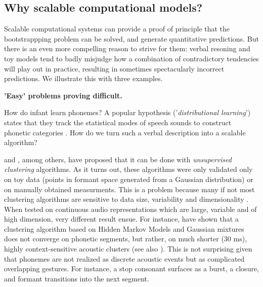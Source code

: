 \documentclass[jou,apacite]{apa6}
\renewcommand{\subsubsection}[1]{\textbf{#1}\hspace{0.3cm}}
\begin{document}
\subsection{Why scalable computational models?}\label{section:model} 




Scalable computational systems can provide a proof of principle that the bootstrappping problem can be solved, and generate quantitative predictions.  But there is an even more compelling reason to strive for them:  verbal resoning and toy models tend to badly misjudge how a combination of contradictory tendencies will play out in practice, resulting in sometimes spectacularly incorrect predictions. We illustrate this with three examples. 


\subsubsection{'Easy' problems proving difficult.}\label{section:theorybenefit}

How do infant learn phonemes? A popular hypothesis ('\textit{distributional learning}') states that they track the statistical modes of speech sounds to construct phonetic categories \cite{maye_2002}. How do we turn such a verbal description into a scalable algorithm?  

 and , among others, have proposed that it can be done with \textit{unsupervised clustering} algorithms.  As it turns out, these algorithms were only validated only on toy data (points in formant space generated from a Gaussian distribution) or on manually obtained measurments. This is a problem because many if not most clustering algorithms are sensitive to data size, variability and dimensionality \cite{fahad_14}. When tested on continuous audio representations which are large, variable and of high dimension, very different result ensue. For instance,  have shown that a clustering algorithm based on Hidden Markov Models and Gaussian mixtures does not converge on phonetic segments, but rather, on much shorter (30 ms), highly context-sensitive acoustic clusters (see also ). This is not surprising given that phonemes are not realized as discrete acoustic events but as complicated overlapping gestures. For instance, a stop consonant surfaces as a burst, a closure, and formant transitions into the next segment.%
\end{document}
